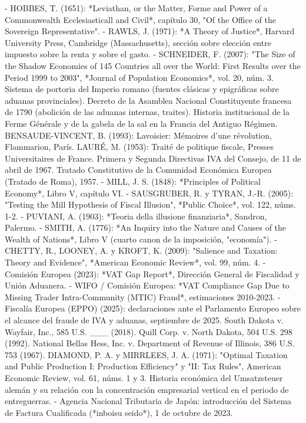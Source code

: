 \documentclass[10pt,a4paper]{article}
\begin{document}
- HOBBES, T. (1651): *Leviathan, or the Matter, Forme and Power of a Commonwealth Ecclesiasticall and Civil*, capítulo 30, "Of the Office of the Sovereign Representative".
- RAWLS, J. (1971): *A Theory of Justice*, Harvard University Press, Cambridge (Massachusetts), sección sobre elección entre impuesto sobre la renta y sobre el gasto.
- SCHNEIDER, F. (2007): "The Size of the Shadow Economies of 145 Countries all over the World: First Results over the Period 1999 to 2003", *Journal of Population Economics*, vol. 20, núm. 3.
Sistema de portoria del Imperio romano (fuentes clásicas y epigráficas sobre aduanas provinciales).
Decreto de la Asamblea Nacional Constituyente francesa de 1790 (abolición de las aduanas internas, traites).
Historia institucional de la Ferme Générale y de la gabela de la sal en la Francia del Antiguo Régimen.
BENSAUDE-VINCENT, B. (1993): Lavoisier: Mémoires d'une révolution, Flammarion, París.
LAURÉ, M. (1953): Traité de politique fiscale, Presses Universitaires de France.
Primera y Segunda Directivas IVA del Consejo, de 11 de abril de 1967.
Tratado Constitutivo de la Comunidad Económica Europea (Tratado de Roma), 1957.
- MILL, J. S. (1848): *Principles of Political Economy*, Libro V, capítulo VI.
- SAUSGRUBER, R. y TYRAN, J.-R. (2005): "Testing the Mill Hypothesis of Fiscal Illusion", *Public Choice*, vol. 122, núms. 1-2.
- PUVIANI, A. (1903): *Teoria della illusione finanziaria*, Sandron, Palermo.
- SMITH, A. (1776): *An Inquiry into the Nature and Causes of the Wealth of Nations*, Libro V (cuarto canon de la imposición, "economía").
- CHETTY, R., LOONEY, A. y KROFT, K. (2009): "Salience and Taxation: Theory and Evidence", *American Economic Review*, vol. 99, núm. 4.
- Comisión Europea (2023): *VAT Gap Report*, Dirección General de Fiscalidad y Unión Aduanera.
- WIFO / Comisión Europea: *VAT Compliance Gap Due to Missing Trader Intra-Community (MTIC) Fraud*, estimaciones 2010-2023.
- Fiscalía Europea (EPPO) (2025): declaraciones ante el Parlamento Europeo sobre el alcance del fraude de IVA y aduanas, septiembre de 2025.
South Dakota v. Wayfair, Inc., 585 U.S. ___ (2018).
Quill Corp. v. North Dakota, 504 U.S. 298 (1992).
National Bellas Hess, Inc. v. Department of Revenue of Illinois, 386 U.S. 753 (1967).
DIAMOND, P. A. y MIRRLEES, J. A. (1971): "Optimal Taxation and Public Production I: Production Efficiency" y "II: Tax Rules", American Economic Review, vol. 61, núms. 1 y 3.
Historia económica del Umsatzsteuer alemán y su relación con la concentración empresarial vertical en el periodo de entreguerras.
- Agencia Nacional Tributaria de Japón: introducción del Sistema de Factura Cualificada (*inboisu seido*), 1 de octubre de 2023.
\end{document}
